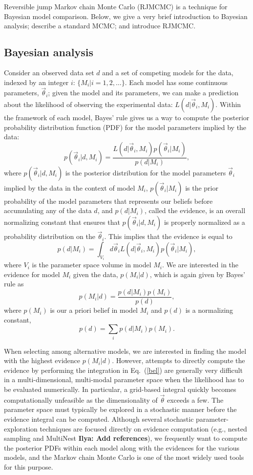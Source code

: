 \documentclass[prd,preprint]{revtex4}
\newcommand{\vtheta}{\vec{\theta}}
\newcommand{\be}{\begin{equation}}
\newcommand{\ee}{\end{equation}}
\newcommand{\bel}[1]{\begin{equation}\label{#1}}
\newcommand{\ilya}[1]{{\color{red} \bf Ilya: #1}}
\begin{document}
Reversible jump Markov chain Monte Carlo (RJMCMC) \cite{Green1995} is a technique for Bayesian model comparison.  Below, we give a very brief introduction to Bayesian analysis; describe a standard MCMC; and introduce RJMCMC.

\subsection{Bayesian analysis}

Consider an observed data set $d$ and a set of competing models for the data, indexed by an integer $i$: $\{M_i | i = 1, 2, \ldots \}$.  Each model has some continuous parameters, $\vtheta_i$; given the model and its parameters, we can make a prediction about the likelihood of observing
the experimental data: $L(d|\vtheta_i, M_i)$.  Within the framework of each model, Bayes' rule gives us a way to compute the posterior probability distribution function (PDF) for the model
parameters implied by the data:
\begin{equation}
  p(\vtheta_i | d, M_i) = \frac{L(d|\vtheta_i, M_i) p(\vtheta_i|M_i)}{p(d|M_i)},
\end{equation}
where $p(\vtheta_i |d, M_i)$ is the posterior distribution for the
model parameters $\vtheta_i$ implied by the data in the context of
model $M_i$, $p(\vtheta_i|M_i)$ is the prior
probability of the model parameters that 
represents our beliefs before accumulating any of the data $d$, and
$p(d|M_i)$, called the evidence, is an overall normalizing constant that ensures that $p(\vtheta_i|d,M_i)$ is properly normalized as a probability distribution on
the $\vtheta_i$.  This implies that the evidence is equal to
\bel{evidence}
  p(d|M_i) = \int_{V_i} d\vtheta_i L(d|\vtheta_i, M_i) p(\vtheta_i|M_i),
\end{equation}
where $V_i$ is the parameter space volume in model $M_i$.  We are interested in the evidence for model $M_i$ given the data, $p(M_i|d)$, which is again given by Bayes' rule as
\begin{equation}
p(M_i|d) = \frac{p(d|M_i) p(M_i)}{p(d)},
\end{equation}
where $p(M_i)$ is our a priori belief in model $M_i$ and $p(d)$ is a normalizing constant, 
\be
p(d)=\sum_i p(d|M_i) p(M_i).
\ee

When selecting among alternative models, we are interested in finding the model with the highest evidence $p(M_i|d)$.  However, attempts to directly compute the evidence by performing the integration in Eq.~(\ref{bel}) are generally very difficult in a multi-dimensional, multi-modal parameter space when the likelihood has to be evaluated numerically.  In particular, a grid-based integral quickly becomes computationally unfeasible as the dimensionality of $\vtheta$ exceeds a few.  The parameter space must typically be explored in a stochastic manner before the evidence integral can be computed.  Although several stochastic parameter-exploration techniques are focused directly on evidence computation (e.g., nested sampling and MultiNest \ilya {Add references}), we frequently want to compute the posterior PDFs within each model along with the evidences for the various models, and the Markov chain Monte Carlo is one of the most widely used tools for this purpose. 
\end{document}
